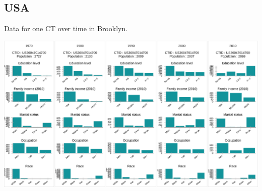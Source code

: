 \documentclass[a4paper]{article}
\begin{document}
\clearpage

\subsection{USA}
Data for one CT over time in Brooklyn.
\begin{center}
  \includegraphics[width=\linewidth]{SampleUS.png}
  
\end{center} 
\end{document}
